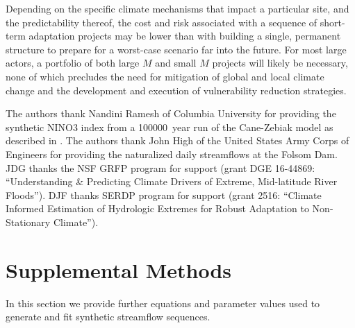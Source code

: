\documentclass[
  draft,
  linenumbers
]{agujournal2018}
\begin{document}
Depending on the specific climate mechanisms that impact a particular site, and the predictability thereof, the cost and risk associated with a sequence of short-term adaptation projects may be lower than with building a single, permanent structure to prepare for a worst-case scenario far into the future.
For most large actors, a portfolio of both large $M$ and small $M$ projects will likely be necessary, none of which precludes the need for mitigation of global and local climate change and the development and execution of vulnerability reduction strategies.


\acknowledgments

The authors thank Nandini Ramesh of Columbia University for providing the synthetic NINO3 index from a \SI{100000}{year} run of the Cane-Zebiak model as described in \citet{Ramesh:2016hf}.
The authors thank John High of the United States Army Corps of Engineers for providing the naturalized daily streamflows at the Folsom Dam.
JDG thanks the NSF GRFP program for support (grant DGE 16-44869: ``Understanding \& Predicting Climate Drivers of Extreme, Mid-latitude River Floods'').
DJF thanks SERDP program for support (grant 2516: ``Climate Informed Estimation of Hydrologic Extremes for Robust Adaptation to Non-Stationary Climate'').




\clearpage
\appendix

\renewcommand{\thefigure}{S\arabic{figure}}
\setcounter{figure}{0}
\renewcommand{\theequation}{S\arabic{equation}}
\setcounter{equation}{0}
\renewcommand{\thetable}{S\arabic{table}}
\setcounter{table}{0}

\section{Supplemental Methods}\label{sec:supp-methods}

In this section we provide further equations and parameter values used to generate and fit synthetic streamflow sequences.
\end{document}
